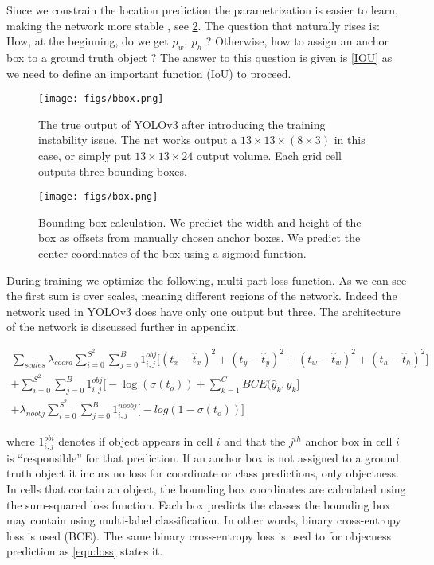 Since we constrain the location prediction the
parametrization is easier to learn, making the network
more stable \cite{YOLOv2}, see \cref{fig:bbox_calculation}.
The question that naturally rises is: How, at the beginning, do we get $p_{w},\ p_{h}$ ? Otherwise, how to assign an anchor box to a ground truth object ?
The answer to this question is given is \cref{IOU} as we need to define an important function (IoU) to proceed.

\bigskip
\begin{figure}[!htbp]
  \centering
  \texttt{[image: figs/bbox.png]}
  \caption[The true output of YOLOv3]{The true output of YOLOv3 after introducing the training instability issue. The net works output a $ 13 \times 13 \times (8 \times 3)$ in this case, or simply put $13 \times 13 \times 24$ output volume. Each grid cell outputs three bounding boxes.}\label{fig:true_yolo_output}
\end{figure}

\begin{figure}[H]
  \centering
  \texttt{[image: figs/box.png]}
  \caption[Bounding box calculation]{Bounding box calculation. We predict the width and height of the box as offsets from manually chosen anchor boxes. We predict the center
    coordinates of the box using a sigmoid function.}\label{fig:bbox_calculation}
\end{figure}

During training we optimize the following, multi-part loss function. As we can see the first sum is over scales, meaning different regions of the network. Indeed the network used in YOLOv3 does have only one output but three. The architecture of the network is discussed further in appendix.

\begin{multline}
  \label{equ:loss}
  \sum_{scales} \lambda_{coord} \sum_{i=0}^{S^2}  \sum_{j=0}^{B} {1}^{obj}_{i,j}  \big[ (t_x - \hat{t}_x)^2  +  (t_y - \hat{t}_y)^2  +  (t_w - \hat{t}_w)^2  +  (t_h - \hat{t}_h)^2  \big] \\
+ \sum_{i=0}^{S^2}  \sum_{j=0}^{B} {1}^{obj}_{i,j} \big[ - \log(\sigma(t_o))  + \sum_{k=1}^{C} BCE(\hat{y}_k, y_k \big]   \\
+ \lambda_{noobj} \sum_{i=0}^{S^2}  \sum_{j=0}^{B} {1}^{noobj}_{i,j}  \big[ -log(1-\sigma(t_o))  \big]
\end{multline}

where $1^{obi}_{i, j}$ denotes if object appears in cell $i$ and that the $j^{th}$ anchor box in cell $i$ is “responsible” for that prediction.
If an anchor box is not assigned to a ground truth object it incurs no loss for coordinate or class predictions, only objectness.
In cells that contain an object, the bounding box coordinates are calculated using the sum-squared loss function.
Each box predicts the classes the bounding box may contain using multi-label classification. In other words, binary cross-entropy loss is used (BCE).
The same binary cross-entropy loss is used to for objecness prediction as \cref{equ:loss} states it.

